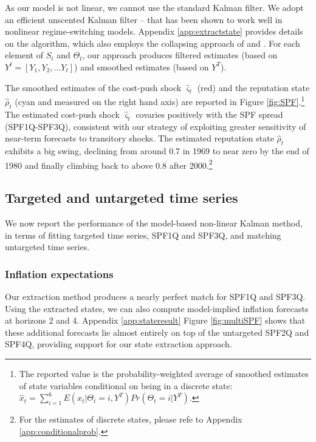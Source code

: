 \documentclass[12pt,letter,leqno]{article}
\theoremstyle{asn}
\theoremstyle{lem}
\theoremstyle{slem}
\theoremstyle{prop}
\theoremstyle{appprop}
\theoremstyle{rem}
\theoremstyle{defn}
\begin{document}
As our model is not linear, we cannot use the standard Kalman filter. We adopt an efficient  unscented Kalman filter -- that has been shown to work well in nonlinear regime-switching models. Appendix \ref{app:extractstate} provides details on the algorithm, which also employs the collapsing approach of \cite{kim_dynamic_1994} and \cite{kim_state-space_2017}. 
For each element of $S_{t}$ and $\Theta_{t}$, our approach produces filtered estimates (based on $Y^{t}=[Y_{1},Y_{2},...Y_{t}]$) and smoothed estimates (based on $Y^T$).


The smoothed estimates of the cost-push shock $\widehat{\varsigma}_t$ (red) and the reputation state $\widehat{\rho}_t$ (cyan and measured on the right hand axis) are reported in Figure \ref{fig:SPF}.\footnote{The reported value is the probability-weighted average of smoothed estimates of state variables conditional on being in a discrete state: $\widehat{x}_t=\sum_{i=1}^6 E(x_t|\Theta_t=i,Y^T)Pr(\Theta_t=i|Y^T)$.}
The estimated cost-push shock $\widehat{\varsigma}_t$ covaries positively with the SPF spread (SPF1Q-SPF3Q), consistent with our strategy of exploiting greater sensitivity of near-term forecasts to transitory shocks. The estimated reputation state $\widehat{\rho}_t$ exhibits a big swing, declining from around 0.7 in 1969 to near zero by the end of 1980 and finally climbing back to above 0.8 after 2000.\footnote{For the estimates of discrete states, please refe to Appendix \ref{app:conditionalprob}.} 

\subsection{Targeted and untargeted time series}
\label{sec:error}

We now report the performance of the model-based non-linear Kalman method, in terms of fitting targeted time series, SPF1Q and SPF3Q, and matching untargeted time series.
\subsubsection{Inflation expectations} 
Our extraction method produces a nearly perfect match for SPF1Q and SPF3Q. Using the extracted states, we can also compute model-implied inflation forecasts at horizons 2 and 4. Appendix \ref{app:stateresult} Figure \ref{fig:multiSPF} shows that these additional forecasts lie almost entirely on top of the untargeted SPF2Q and SPF4Q, providing support for our state extraction approach. 
\end{document}
